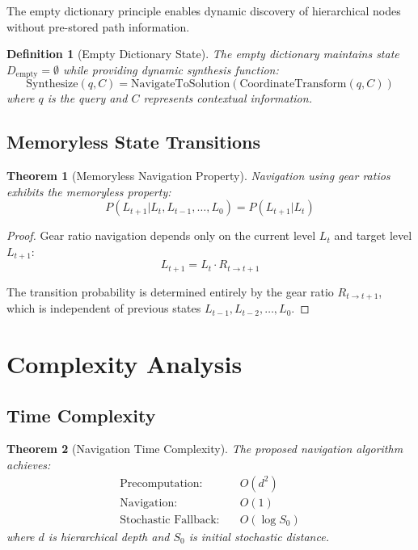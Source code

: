 \documentclass[12pt,a4paper]{article}
\newtheorem{theorem}{Theorem}
\newtheorem{definition}{Definition}
\begin{document}
The empty dictionary principle enables dynamic discovery of hierarchical nodes without pre-stored path information.

\begin{definition}[Empty Dictionary State]
The empty dictionary maintains state $D_{\text{empty}} = \emptyset$ while providing dynamic synthesis function:
\begin{equation}
\text{Synthesize}(q, C) = \text{NavigateToSolution}(\text{CoordinateTransform}(q, C))
\end{equation}
where $q$ is the query and $C$ represents contextual information.
\end{definition}

\subsection{Memoryless State Transitions}

\begin{theorem}[Memoryless Navigation Property]
Navigation using gear ratios exhibits the memoryless property:
\begin{equation}
P(L_{t+1} | L_t, L_{t-1}, \ldots, L_0) = P(L_{t+1} | L_t)
\end{equation}
\end{theorem}

\begin{proof}
Gear ratio navigation depends only on the current level $L_t$ and target level $L_{t+1}$:
\begin{equation}
L_{t+1} = L_t \cdot R_{t \to t+1}
\end{equation}

The transition probability is determined entirely by the gear ratio $R_{t \to t+1}$, which is independent of previous states $L_{t-1}, L_{t-2}, \ldots, L_0$.
\end{proof}

\section{Complexity Analysis}

\subsection{Time Complexity}

\begin{theorem}[Navigation Time Complexity]
The proposed navigation algorithm achieves:
\begin{align}
\text{Precomputation}: &\quad O(d^2) \\
\text{Navigation}: &\quad O(1) \\
\text{Stochastic Fallback}: &\quad O(\log S_0)
\end{align}
where $d$ is hierarchical depth and $S_0$ is initial stochastic distance.
\end{theorem}
\end{document}
